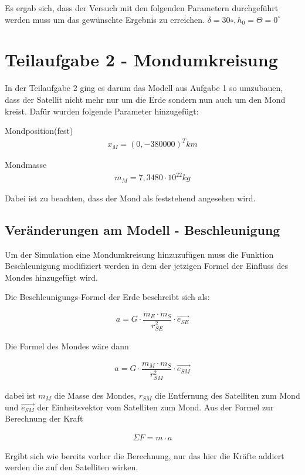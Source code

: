 \documentclass[]{scrartcl}
\begin{document}
Es ergab sich, dass der Versuch mit den folgenden Parametern durchgeführt werden muss um das gewünschte Ergebnis zu erreichen.
 $\delta = 30\circ, h_0 =  \Theta = 0^\circ $ 


\section{Teilaufgabe 2 - Mondumkreisung}
In der Teilaufgabe 2 ging es darum das Modell aus Aufgabe 1 so umzubauen, dass der Satellit nicht mehr nur um die Erde sondern nun auch um den Mond kreist. Dafür wurden folgende Parameter hinzugefügt:

Mondposition(fest)
\begin{align}
x_{M} = (0,-380000)^T km
\end{align}

Mondmasse
\begin{align}
m_{M} = 7,3480 \cdot 10^{22} kg
\end{align}

Dabei ist zu beachten, dass der Mond als feststehend angesehen wird.

\subsection{Veränderungen am Modell - Beschleunigung}
Um der Simulation eine Mondumkreisung hinzuzufügen muss die Funktion Beschleunigung modifiziert werden in dem der jetzigen Formel der Einfluss des Mondes hinzugefügt wird.

Die Beschleunigungs-Formel der Erde beschreibt sich als:

\begin{align}
a = G \cdot \dfrac{m_E \cdot m_S }{r^2_{SE}} \cdot \vec{e_{SE}}
\end{align}

Die Formel des Mondes wäre dann

\begin{align}
a = G \cdot \dfrac{m_M \cdot m_S }{r^2_{SM}} \cdot \vec{e_{SM}}
\end{align}

dabei ist $m_M$ die Masse des Mondes, $r_{SM}$ die Entfernung des Satelliten zum Mond und $ \vec{e_{SM}}$ der Einheitsvektor vom Satelliten zum Mond.
Aus der Formel zur Berechnung der Kraft

\begin{align}
\Sigma{F} = m \cdot a
\end{align}

Ergibt sich wie bereits vorher die Berechnung, nur das hier die Kräfte addiert werden die auf den Satelliten wirken.
\end{document}
